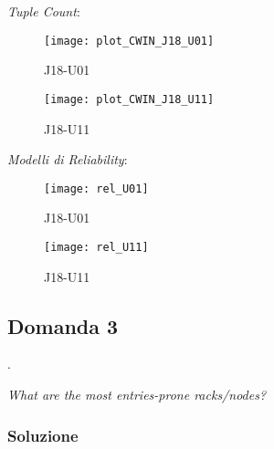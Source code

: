 \textit{Tuple Count}:

\begin{minipage}{\linewidth}
  \begin{minipage}{\linewidth}
    \begin{figure}[H]
      \texttt{[image: plot\_CWIN\_J18\_U01]}
      \caption*{J18-U01}
    \end{figure}
  \end{minipage}
  \begin{minipage}{\linewidth}
    \begin{figure}[H]
      \texttt{[image: plot\_CWIN\_J18\_U11]}
      \caption*{J18-U11}
    \end{figure}
  \end{minipage}
\end{minipage}

\clearpage

\textit{Modelli di Reliability}:

\begin{minipage}{\linewidth}
  \centering
  \begin{minipage}{.7\linewidth}
    \begin{figure}[H]
      \texttt{[image: rel\_U01]}
      \caption*{J18-U01}
    \end{figure}
  \end{minipage}

  \begin{minipage}{.7\linewidth}
    \begin{figure}[H]
      \texttt{[image: rel\_U11]}
      \caption*{J18-U11}
    \end{figure}
  \end{minipage}
\end{minipage}

\clearpage

\subsection{Domanda 3}.

\textit{What are the most entries-prone racks/nodes?}\\

\subsubsection*{Soluzione}

